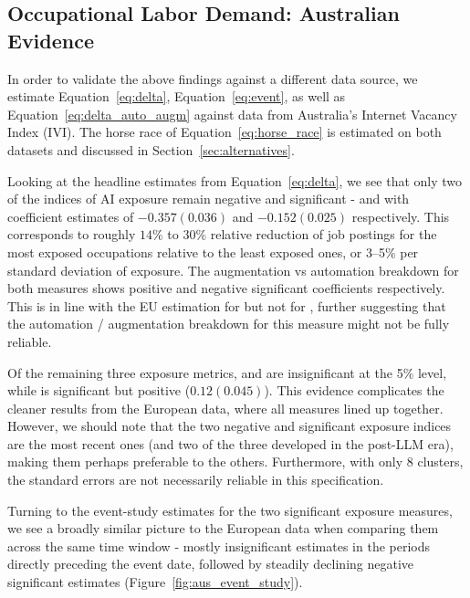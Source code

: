 \documentclass[11pt]{article}
\begin{document}
\subsection{Occupational Labor Demand: Australian Evidence}
\label{sec:aus_results}

In order to validate the above findings against a different data source, we estimate Equation~\ref{eq:delta}, Equation~\ref{eq:event}, as well as Equation~\ref{eq:delta_auto_augm} against data from Australia's Internet Vacancy Index (IVI). The horse race of Equation~\ref{eq:horse_race} is estimated on both datasets and discussed in Section~\ref{sec:alternatives}.

Looking at the headline estimates from Equation~\ref{eq:delta}, we see that only two of the indices of AI exposure remain negative and significant - \citet{handa2025economic} and \citet{demirev2024assessing} with coefficient estimates of $-0.357 (0.036)$ and $-0.152 (0.025)$ respectively. This corresponds to roughly $14\%$ to $30\%$ relative reduction of job postings for the most exposed occupations relative to the least exposed ones, or 3--5\% per standard deviation of exposure. The augmentation vs automation breakdown for both measures shows positive and negative significant coefficients respectively. This is in line with the EU estimation for \citet{handa2025economic} but not for \citet{demirev2024assessing}, further suggesting that the automation / augmentation breakdown for this measure might not be fully reliable.

Of the remaining three exposure metrics, \citet{eloundou_gpts_2023} and \citet{webb_impact_2022} are insignificant at the 5\% level, while \citet{felten_method_2018} is significant but positive ($0.12 (0.045)$). This evidence complicates the cleaner results from the European data, where all measures lined up together. However, we should note that the two negative and significant exposure indices are the most recent ones (and two of the three developed in the post-LLM era), making them perhaps preferable to the others. Furthermore, with only 8 clusters, the standard errors are not necessarily reliable in this specification.

Turning to the event-study estimates for the two significant exposure measures, we see a broadly similar picture to the European data when comparing them across the same time window - mostly insignificant estimates in the periods directly preceding the event date, followed by steadily declining negative significant estimates (Figure~\ref{fig:aus_event_study}).
\end{document}
